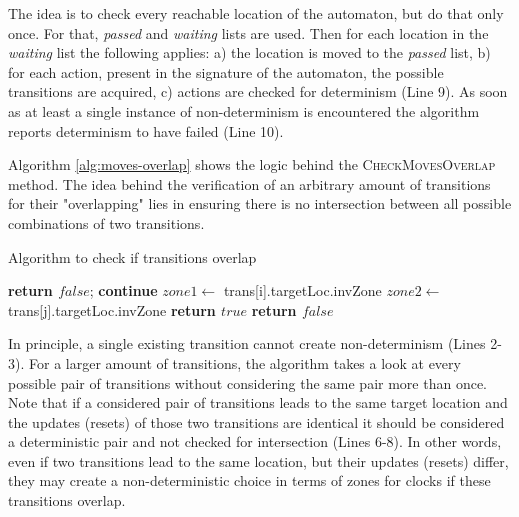 The idea is to check every reachable location of the automaton, but do that only once. For that, \textit{passed} and \textit{waiting} lists are used. Then for each location in the \textit{waiting} list the following applies: a) the location is moved to the \textit{passed} list, b) for each action, present in the signature of the automaton, the possible transitions are acquired, c) actions are checked for determinism (Line 9). As soon as at least a single instance of non-determinism is encountered the algorithm reports determinism to have failed (Line 10). 

Algorithm \ref{alg:moves-overlap} shows the logic behind the \textsc{CheckMovesOverlap} method. The idea behind the verification of an arbitrary amount of transitions for their "overlapping" lies in ensuring there is no intersection between all possible combinations of two transitions.

\begin{algorithm}
\caption{Algorithm to check if transitions overlap}
\label{alg:moves-overlap}
\begin{algorithmic}[1]
    \State \textbf{return $false$};
\EndIf
        \State \textbf{continue}
        \EndIf
        \EndIf
        \State $zone1 \gets$ trans[i].targetLoc.invZone
        \State $zone2 \gets$ trans[j].targetLoc.invZone
            \State \textbf{return $true$}
            \EndIf
        \EndFor
    \EndFor
\State
\State \textbf{return $false$}	
\EndFunction
\end{algorithmic}
\end{algorithm}

In principle, a single existing transition cannot create non-determinism (Lines 2-3). For a larger amount of transitions, the algorithm takes a look at every possible pair of transitions without considering the same pair more than once. Note that if a considered pair of transitions leads to the same target location and the updates (resets) of those two transitions are identical it should be considered a deterministic pair and not checked for intersection (Lines 6-8). In other words, even if two transitions lead to the same location, but their updates (resets) differ, they may create a non-deterministic choice in terms of zones for clocks if these transitions overlap.


